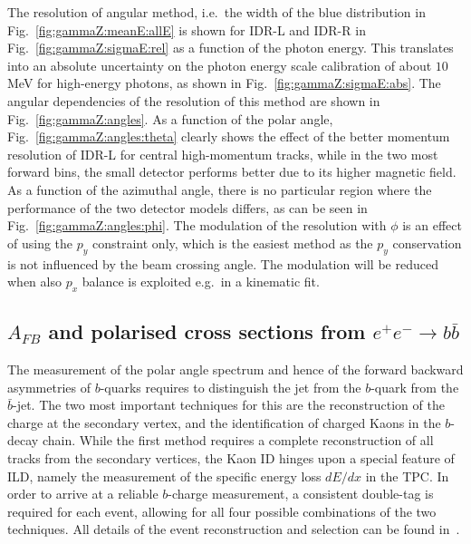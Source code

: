 The resolution of angular method, i.e.\ the width of the blue distribution in Fig.~\ref{fig:gammaZ:meanE:allE} is shown for IDR-L and IDR-R in Fig.~\ref{fig:gammaZ:sigmaE:rel} as a function of the photon energy. This translates into
an absolute uncertainty on the photon energy scale calibration of about $10$\,MeV for high-energy photons, as shown in Fig.~\ref{fig:gammaZ:sigmaE:abs}. 
The angular dependencies of the resolution of this method are shown in Fig.~\ref{fig:gammaZ:angles}. As a function of the polar angle, Fig.~\ref{fig:gammaZ:angles:theta} clearly shows the effect of the better momentum resolution of IDR-L for central high-momentum tracks, while in the two most forward bins, the small detector performs better due to its higher magnetic field. As a function of the azimuthal angle, there is no particular region where the performance of the two detector models differs, as can be seen in Fig.~\ref{fig:gammaZ:angles:phi}. The modulation of the resolution with $\phi$ is an effect of using the $p_y$ constraint only, which is the easiest method as the $p_y$ conservation is not influenced by the beam crossing angle. The modulation will be reduced when also $p_x$ balance is exploited e.g.\ in a kinematic fit.

\subsection{\texorpdfstring{$A_{FB}$ and polarised cross sections from $e^+e^- \to b\bar{b}$}{AFB and ALR from ee -> bb}}
\label{subsec:bench:bbbar}

The measurement of the polar angle spectrum and hence of the forward backward asymmetries of $b$-quarks requires to distinguish the jet from the $b$-quark from the $\bar{b}$-jet. The two most important techniques for this are the reconstruction of the charge at the secondary vertex, and the identification of charged Kaons in the $b$-decay chain. While the first method requires a complete reconstruction of all tracks from the secondary vertices, the Kaon ID hinges upon a special
feature of ILD, namely the measurement of the specific energy loss $dE/dx$ in the TPC. In order to arrive at a reliable $b$-charge measurement, a consistent double-tag is required for each event, allowing for all four  possible combinations of the two techniques. All details of the event reconstruction and selection can be found in~\cite{ILDNote:bbtt}.

